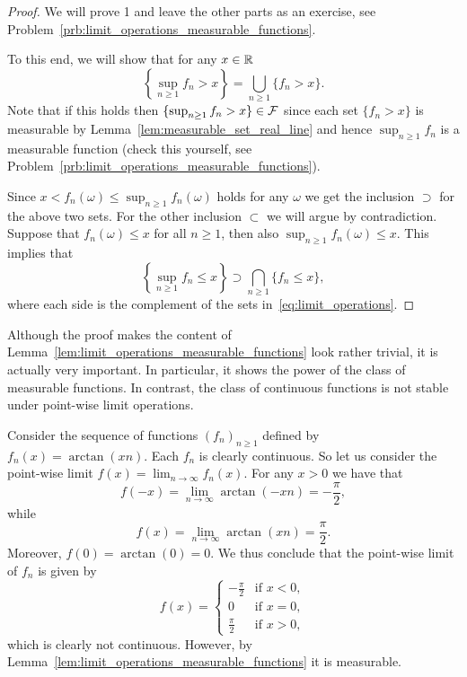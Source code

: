 \begin{proof}
We will prove 1 and leave the other parts as an exercise, see Problem~\ref{prb:limit_operations_measurable_functions}. 

To this end, we will show that for any $x \in \mathbb R$
\begin{equation}\label{eq:limit_operations}
	\left\{\sup_{n \ge 1} f_n > x\right\} = \bigcup_{n \ge 1} \{f_n > x\}.
\end{equation}
Note that if this holds then $\{\sup_{n \ge 1} f_n > x\} \in \mathcal F$ since each set $\{f_n > x\}$ is measurable by Lemma~\ref{lem:measurable_set_real_line} and hence $\sup_{n \ge 1} f_n$ is a measurable function (check this yourself, see Problem~\ref{prb:limit_operations_measurable_functions}).

Since $x < f_n(\omega) \le \sup_{n \ge 1} f_n(\omega)$ holds for any $\omega$ we get the inclusion $\supset$ for the above two sets. For the other inclusion $\subset$ we will argue by contradiction. Suppose that $f_n(\omega) \le x$ for all $n \ge 1$, then also $\sup_{n \ge 1} f_n(\omega) \le x$. This implies that
\[
	\left\{\sup_{n \ge 1} f_n \le x\right\} \supset \bigcap_{n \ge 1} \{f_n \le x\},
\] 
where each side is the complement of the sets in~\eqref{eq:limit_operations}.
\end{proof}

Although the proof makes the content of Lemma~\ref{lem:limit_operations_measurable_functions} look rather trivial, it is actually very important. In particular, it shows the power of the class of measurable functions. In contrast, the class of continuous functions is not stable under point-wise limit operations. 

\begin{example}
Consider the sequence of functions $(f_n)_{n \ge 1}$ defined by $f_n(x) = \arctan(xn)$. Each $f_n$ is clearly continuous. So let us consider the point-wise limit $f(x) = \lim_{n \to \infty} f_n(x)$. For any $x > 0$ we have that
\[
	f(-x) = \lim_{n \to \infty} \arctan(-x n) = -\frac{\pi}{2},
\]
while
\[
	f(x) = \lim_{n \to \infty} \arctan(x n) = \frac{\pi}{2}.
\]
Moreover, $f(0) = \arctan(0) = 0$. We thus conclude that the point-wise limit of $f_n$ is given by
\[
	f(x) = \begin{cases}
		-\frac{\pi}{2} &\text{if } x < 0,\\
		0 &\text{if } x = 0,\\
		\frac{\pi}{2} &\text{if } x >0,
	\end{cases}
\]
which is clearly not continuous. However, by Lemma~\ref{lem:limit_operations_measurable_functions} it is measurable.
\end{example}

